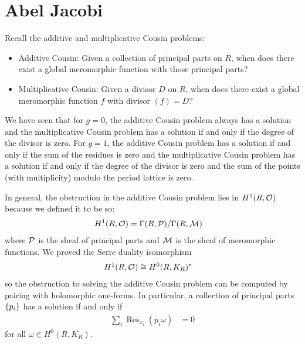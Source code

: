 \documentclass[12pt]{article}
\begin{document}
\section{Abel Jacobi}
Recall the additive and multiplicative Cousin problems: 
\begin{itemize}
    \item Additive Cousin: Given a collection of principal parts on $R$, when does there exist a global meromorphic function with those principal parts?
    \item Multiplicative Cousin: Given a divisor $D$ on $R$, when does there exist a global meromorphic function $f$ with divisor $(f) = D$?
\end{itemize}
We have seen that for $g=0$, the additive Cousin problem always has a solution and the multiplicative Cousin problem has a solution if and only if the degree of the divisor is zero. For $g = 1$, the additive Cousin problem has a solution if and only if the sum of the residues is zero and the multiplicative Cousin problem has a solution if and only if the degree of the divisor is zero and the sum of the points (with multiplicity) modulo the period lattice is zero.

In general, the obstruction in the additive Cousin problem lies in $H^1(R, {\mathcal{O}})$ because we defined it to be so:
\begin{align*}
    H^1(R, {\mathcal{O}}) & = \Gamma(R, {\mathcal{P}}) / \Gamma(R, {\mathcal{M}})
\end{align*} where ${\mathcal{P}}$ is the sheaf of principal parts and ${\mathcal{M}}$ is the sheaf of meromorphic functions. We proved the Serre duality isomorphism \begin{align*}
    H^1(R, {\mathcal{O}}) & \cong H^0(R, K_R)^*
\end{align*} so the obstruction to solving the additive Cousin problem can be computed by pairing with holomorphic one-forms. In particular, a collection of principal parts $\{p_i\}$ has a solution if and only if \begin{align*}
    \sum_i \operatorname{Res}_{x_i}(p_i \omega) & = 0
\end{align*} for all $\omega \in H^0(R, K_R)$.
\end{document}
